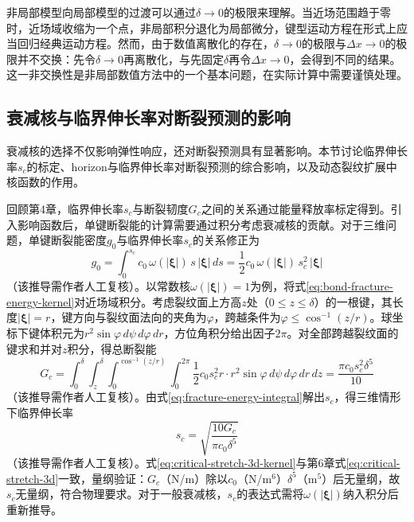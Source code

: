 非局部模型向局部模型的过渡可以通过$\delta\to 0$的极限来理解。当近场范围趋于零时，近场域收缩为一个点，非局部积分退化为局部微分，键型运动方程在形式上应当回归经典运动方程。然而，由于数值离散化的存在，$\delta\to 0$的极限与$\Delta x\to 0$的极限并不交换：先令$\delta\to 0$再离散化，与先固定$\delta$再令$\Delta x\to 0$，会得到不同的结果。这一非交换性是非局部数值方法中的一个基本问题，在实际计算中需要谨慎处理。


\subsection{衰减核与临界伸长率对断裂预测的影响}\label{sec:kernel-fracture}

衰减核的选择不仅影响弹性响应，还对断裂预测具有显著影响。本节讨论临界伸长率$s_{c}$的标定、horizon与临界伸长率对断裂预测的综合影响，以及动态裂纹扩展中核函数的作用。

回顾第4章，临界伸长率$s_{c}$与断裂韧度$G_{c}$之间的关系通过能量释放率标定得到。引入影响函数后，单键断裂能的计算需要通过积分考虑衰减核的贡献。对于三维问题，单键断裂能密度$g_{0}$与临界伸长率$s_{c}$的关系修正为
\begin{equation}
  g_{0}=\int_{0}^{s_{c}}c_{0}\,\omega(|\boldsymbol{\xi}|)\,s\,|\boldsymbol{\xi}|\,ds=\frac{1}{2}c_{0}\,\omega(|\boldsymbol{\xi}|)\,s_{c}^{2}\,|\boldsymbol{\xi}|
  \label{eq:bond-fracture-energy-kernel}
\end{equation}
（该推导需作者人工复核）。以常数核$\omega(|\boldsymbol{\xi}|)=1$为例，将式\eqref{eq:bond-fracture-energy-kernel}对近场域积分。考虑裂纹面上方高$z$处（$0\le z\le\delta$）的一根键，其长度$|\boldsymbol{\xi}|=r$，键方向与裂纹面法向的夹角为$\varphi$，跨越条件为$\varphi\le\cos^{-1}(z/r)$。球坐标下键体积元为$r^{2}\sin\varphi\,d\psi\,d\varphi\,dr$，方位角积分给出因子$2\pi$。对全部跨越裂纹面的键求和并对$z$积分，得总断裂能
\begin{equation}
  G_{c}=\int_{0}^{\delta}\int_{z}^{\delta}\int_{0}^{\cos^{-1}(z/r)}\int_{0}^{2\pi}\frac{1}{2}c_{0}s_{c}^{2}r\cdot r^{2}\sin\varphi\,d\psi\,d\varphi\,dr\,dz=\frac{\pi c_{0}s_{c}^{2}\delta^{5}}{10}
  \label{eq:fracture-energy-integral}
\end{equation}
（该推导需作者人工复核）。由式\eqref{eq:fracture-energy-integral}解出$s_{c}$，得三维情形下临界伸长率
\begin{equation}
  s_{c}=\sqrt{\frac{10G_{c}}{\pi c_{0}\delta^{5}}}
  \label{eq:critical-stretch-3d-kernel}
\end{equation}
（该推导需作者人工复核）。式\eqref{eq:critical-stretch-3d-kernel}与第6章式\eqref{eq:critical-stretch-3d}一致，量纲验证：$G_{c}$（N/m）除以$c_{0}$（N/m$^{6}$）$\delta^{5}$（m$^{5}$）后无量纲，故$s_{c}$无量纲，符合物理要求。对于一般衰减核，$s_{c}$的表达式需将$\omega(|\boldsymbol{\xi}|)$纳入积分后重新推导。

